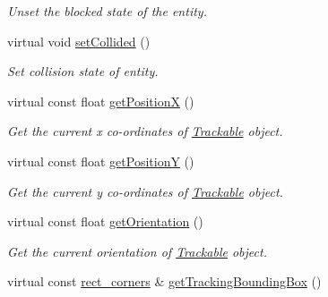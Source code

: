 \begin{DoxyCompactItemize}
\begin{DoxyCompactList}\small\item\em Unset the blocked state of the entity. \end{DoxyCompactList}\item 
\hypertarget{class_turret_a2f558a151cc9c7e7f2158c71f71261cb}{virtual void \hyperlink{class_turret_a2f558a151cc9c7e7f2158c71f71261cb}{set\+Collided} ()}\label{class_turret_a2f558a151cc9c7e7f2158c71f71261cb}

\begin{DoxyCompactList}\small\item\em Set collision state of entity. \end{DoxyCompactList}\item 
\hypertarget{class_turret_a3e713aaf3b26c4dfc49893b4a7796dfd}{virtual const float \hyperlink{class_turret_a3e713aaf3b26c4dfc49893b4a7796dfd}{get\+Position\+X} ()}\label{class_turret_a3e713aaf3b26c4dfc49893b4a7796dfd}

\begin{DoxyCompactList}\small\item\em Get the current x co-\/ordinates of \hyperlink{class_trackable}{Trackable} object. \end{DoxyCompactList}\item 
\hypertarget{class_turret_a9d331d408eec415f38ea8249fb0ad3ef}{virtual const float \hyperlink{class_turret_a9d331d408eec415f38ea8249fb0ad3ef}{get\+Position\+Y} ()}\label{class_turret_a9d331d408eec415f38ea8249fb0ad3ef}

\begin{DoxyCompactList}\small\item\em Get the current y co-\/ordinates of \hyperlink{class_trackable}{Trackable} object. \end{DoxyCompactList}\item 
\hypertarget{class_turret_a7a6d4d2ca7bd5c1c4869298e77e3f1f5}{virtual const float \hyperlink{class_turret_a7a6d4d2ca7bd5c1c4869298e77e3f1f5}{get\+Orientation} ()}\label{class_turret_a7a6d4d2ca7bd5c1c4869298e77e3f1f5}

\begin{DoxyCompactList}\small\item\em Get the current orientation of \hyperlink{class_trackable}{Trackable} object. \end{DoxyCompactList}\item 
\hypertarget{class_turret_ac39a14672e27fd2399b57386a55b5c04}{virtual const \hyperlink{structrect__corners}{rect\+\_\+corners} \& \hyperlink{class_turret_ac39a14672e27fd2399b57386a55b5c04}{get\+Tracking\+Bounding\+Box} ()}\label{class_turret_ac39a14672e27fd2399b57386a55b5c04}


\end{DoxyCompactItemize}
